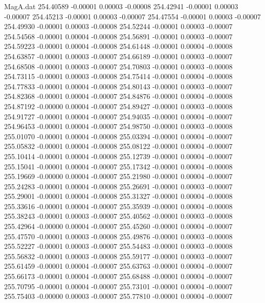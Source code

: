 \begin{filecontents}{MagA.dat}
 254.40589   -0.00001    0.00003   -0.00008
 254.42941   -0.00001    0.00003   -0.00007
 254.45213   -0.00001    0.00003   -0.00007
 254.47554   -0.00001    0.00003   -0.00007
 254.49930   -0.00001    0.00003   -0.00008
 254.52244   -0.00001    0.00003   -0.00007
 254.54568   -0.00001    0.00004   -0.00008
 254.56891   -0.00001    0.00003   -0.00007
 254.59223   -0.00001    0.00004   -0.00008
 254.61448   -0.00001    0.00004   -0.00008
 254.63857   -0.00001    0.00003   -0.00007
 254.66189   -0.00001    0.00003   -0.00007
 254.68508   -0.00001    0.00003   -0.00007
 254.70803   -0.00001    0.00003   -0.00008
 254.73115   -0.00001    0.00003   -0.00008
 254.75414   -0.00001    0.00004   -0.00008
 254.77833   -0.00001    0.00004   -0.00008
 254.80143   -0.00001    0.00003   -0.00007
 254.82368   -0.00001    0.00004   -0.00007
 254.84876   -0.00001    0.00004   -0.00008
 254.87192   -0.00000    0.00004   -0.00007
 254.89427   -0.00001    0.00003   -0.00008
 254.91727   -0.00001    0.00004   -0.00007
 254.94035   -0.00001    0.00004   -0.00007
 254.96453   -0.00001    0.00004   -0.00007
 254.98750   -0.00001    0.00003   -0.00008
 255.01070   -0.00001    0.00004   -0.00008
 255.03394   -0.00001    0.00004   -0.00007
 255.05832   -0.00001    0.00004   -0.00008
 255.08122   -0.00001    0.00004   -0.00007
 255.10414   -0.00001    0.00004   -0.00008
 255.12739   -0.00001    0.00004   -0.00007
 255.15041   -0.00001    0.00004   -0.00007
 255.17342   -0.00001    0.00004   -0.00008
 255.19669   -0.00000    0.00004   -0.00007
 255.21980   -0.00001    0.00004   -0.00007
 255.24283   -0.00001    0.00004   -0.00008
 255.26691   -0.00001    0.00003   -0.00007
 255.29001   -0.00001    0.00004   -0.00008
 255.31327   -0.00001    0.00004   -0.00008
 255.33616   -0.00001    0.00004   -0.00007
 255.35939   -0.00001    0.00004   -0.00008
 255.38243   -0.00001    0.00003   -0.00007
 255.40562   -0.00001    0.00003   -0.00008
 255.42964   -0.00000    0.00004   -0.00007
 255.45260   -0.00001    0.00004   -0.00007
 255.47570   -0.00001    0.00003   -0.00008
 255.49876   -0.00001    0.00003   -0.00008
 255.52227   -0.00001    0.00003   -0.00007
 255.54483   -0.00001    0.00003   -0.00008
 255.56832   -0.00001    0.00003   -0.00008
 255.59177   -0.00001    0.00003   -0.00007
 255.61459   -0.00001    0.00004   -0.00007
 255.63763   -0.00001    0.00004   -0.00007
 255.66173   -0.00001    0.00004   -0.00007
 255.68488   -0.00001    0.00004   -0.00007
 255.70795   -0.00001    0.00004   -0.00007
 255.73101   -0.00001    0.00004   -0.00007
 255.75403   -0.00000    0.00003   -0.00007
 255.77810   -0.00001    0.00004   -0.00007

\end{filecontents}
